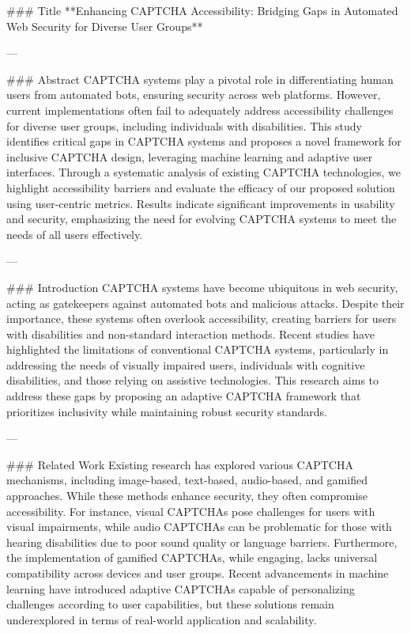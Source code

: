 ### Title
**Enhancing CAPTCHA Accessibility: Bridging Gaps in Automated Web Security for Diverse User Groups**

---

### Abstract
CAPTCHA systems play a pivotal role in differentiating human users from automated bots, ensuring security across web platforms. However, current implementations often fail to adequately address accessibility challenges for diverse user groups, including individuals with disabilities. This study identifies critical gaps in CAPTCHA systems and proposes a novel framework for inclusive CAPTCHA design, leveraging machine learning and adaptive user interfaces. Through a systematic analysis of existing CAPTCHA technologies, we highlight accessibility barriers and evaluate the efficacy of our proposed solution using user-centric metrics. Results indicate significant improvements in usability and security, emphasizing the need for evolving CAPTCHA systems to meet the needs of all users effectively. 

---

### Introduction
CAPTCHA systems have become ubiquitous in web security, acting as gatekeepers against automated bots and malicious attacks. Despite their importance, these systems often overlook accessibility, creating barriers for users with disabilities and non-standard interaction methods. Recent studies have highlighted the limitations of conventional CAPTCHA systems, particularly in addressing the needs of visually impaired users, individuals with cognitive disabilities, and those relying on assistive technologies. This research aims to address these gaps by proposing an adaptive CAPTCHA framework that prioritizes inclusivity while maintaining robust security standards.

---

### Related Work
Existing research has explored various CAPTCHA mechanisms, including image-based, text-based, audio-based, and gamified approaches. While these methods enhance security, they often compromise accessibility. For instance, visual CAPTCHAs pose challenges for users with visual impairments, while audio CAPTCHAs can be problematic for those with hearing disabilities due to poor sound quality or language barriers. Furthermore, the implementation of gamified CAPTCHAs, while engaging, lacks universal compatibility across devices and user groups. Recent advancements in machine learning have introduced adaptive CAPTCHAs capable of personalizing challenges according to user capabilities, but these solutions remain underexplored in terms of real-world application and scalability.

